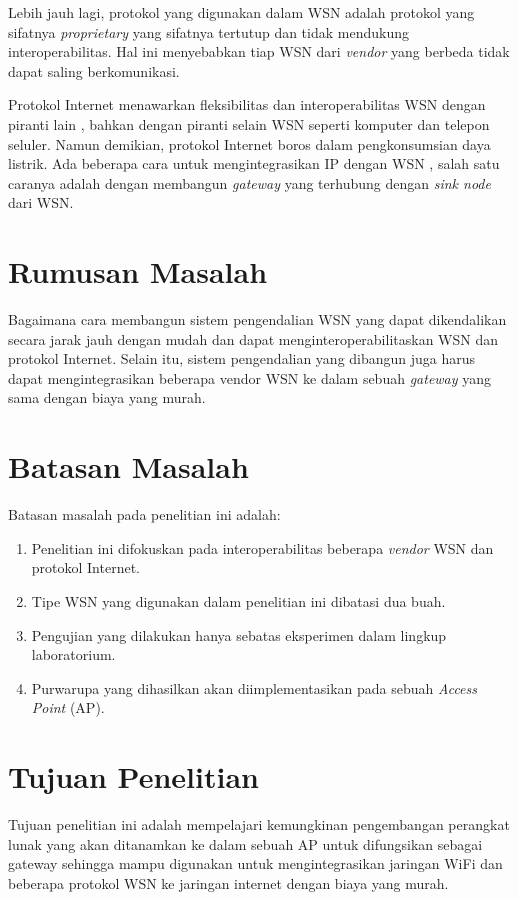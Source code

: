 Lebih jauh lagi, protokol yang digunakan dalam WSN adalah protokol yang sifatnya \emph{proprietary} yang sifatnya tertutup dan tidak mendukung interoperabilitas. Hal ini menyebabkan tiap WSN dari \emph{vendor} yang berbeda tidak dapat saling berkomunikasi.

Protokol Internet menawarkan fleksibilitas dan interoperabilitas WSN dengan piranti lain \cite{Hwang2003}, bahkan dengan piranti selain WSN seperti komputer dan telepon seluler. Namun demikian, protokol Internet boros dalam pengkonsumsian daya listrik. Ada beberapa cara untuk mengintegrasikan IP dengan WSN \cite{Rodrigues2010}, salah satu caranya adalah dengan membangun \emph{gateway} \cite{DaSilvaCampos2011} yang terhubung dengan \emph{sink node} dari WSN.


\section{Rumusan Masalah}
Bagaimana cara membangun sistem pengendalian WSN yang dapat dikendalikan secara jarak jauh dengan mudah dan dapat menginteroperabilitaskan WSN dan protokol Internet. Selain itu, sistem pengendalian yang dibangun juga harus dapat mengintegrasikan beberapa vendor WSN ke dalam sebuah \emph{gateway} yang sama dengan biaya yang murah.


\section{Batasan Masalah}
Batasan masalah pada penelitian ini adalah:
\begin{enumerate}
\item Penelitian ini difokuskan pada interoperabilitas beberapa \emph{vendor} WSN dan protokol Internet.
\item Tipe WSN yang digunakan dalam penelitian ini dibatasi dua buah.
\item Pengujian yang dilakukan hanya sebatas eksperimen dalam lingkup laboratorium.
\item Purwarupa yang dihasilkan akan diimplementasikan pada sebuah \emph{Access Point} (AP).
\end{enumerate}


\section{Tujuan Penelitian}
Tujuan penelitian ini adalah mempelajari kemungkinan pengembangan perangkat lunak yang akan ditanamkan ke dalam sebuah AP untuk difungsikan sebagai gateway sehingga mampu digunakan untuk mengintegrasikan jaringan WiFi dan beberapa protokol WSN ke jaringan internet dengan biaya yang murah.


